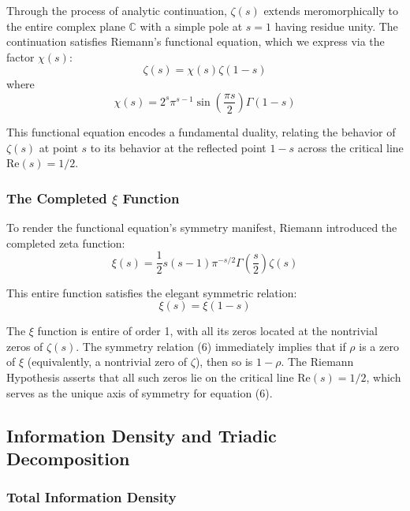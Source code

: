 \documentclass[12pt]{article}
\theoremstyle{plain}
\theoremstyle{definition}
\begin{document}
Through the process of analytic continuation, $\zeta(s)$ extends meromorphically to the entire complex plane $\mathbb{C}$ with a simple pole at $s=1$ having residue unity. The continuation satisfies Riemann's functional equation, which we express via the factor $\chi(s)$:
\begin{equation}
\zeta(s) = \chi(s) \zeta(1-s)
\end{equation}
where
\begin{equation}
\chi(s) = 2^s \pi^{s-1} \sin\left(\frac{\pi s}{2}\right) \Gamma(1-s)
\end{equation}

This functional equation encodes a fundamental duality, relating the behavior of $\zeta(s)$ at point $s$ to its behavior at the reflected point $1-s$ across the critical line $\text{Re}(s) = 1/2$.

\subsubsection{The Completed $\xi$ Function}

To render the functional equation's symmetry manifest, Riemann introduced the completed zeta function:
\begin{equation}
\xi(s) = \frac{1}{2} s(s-1) \pi^{-s/2} \Gamma\left(\frac{s}{2}\right) \zeta(s)
\end{equation}

This entire function satisfies the elegant symmetric relation:
\begin{equation}
\xi(s) = \xi(1-s)
\end{equation}

The $\xi$ function is entire of order 1, with all its zeros located at the nontrivial zeros of $\zeta(s)$. The symmetry relation (6) immediately implies that if $\rho$ is a zero of $\xi$ (equivalently, a nontrivial zero of $\zeta$), then so is $1-\rho$. The Riemann Hypothesis asserts that all such zeros lie on the critical line $\text{Re}(s) = 1/2$, which serves as the unique axis of symmetry for equation (6).

\subsection{Information Density and Triadic Decomposition}

\subsubsection{Total Information Density}
\end{document}
